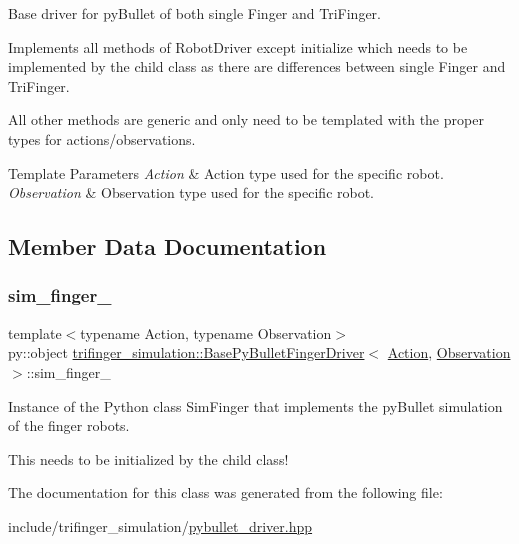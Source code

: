 Base driver for py\+Bullet of both single Finger and Tri\+Finger. 

Implements all methods of Robot\+Driver except {\ttfamily initialize} which needs to be implemented by the child class as there are differences between single Finger and Tri\+Finger.

All other methods are generic and only need to be templated with the proper types for actions/observations.


\begin{DoxyTemplParams}{Template Parameters}
{\em Action} & Action type used for the specific robot. \\
\hline
{\em Observation} & Observation type used for the specific robot. \\
\hline
\end{DoxyTemplParams}


\subsection{Member Data Documentation}
\mbox{\label{classtrifinger__simulation_1_1BasePyBulletFingerDriver_a9f997da6855f64ca5c483093cfb66b06}} 
\subsubsection{\texorpdfstring{sim\+\_\+finger\+\_\+}{sim\_finger\_}}
{\footnotesize\ttfamily template$<$typename Action, typename Observation$>$ \\
py\+::object \hyperlink{classtrifinger__simulation_1_1BasePyBulletFingerDriver}{trifinger\+\_\+simulation\+::\+Base\+Py\+Bullet\+Finger\+Driver}$<$ \hyperlink{classtrifinger__simulation_1_1action_1_1Action}{Action}, \hyperlink{classtrifinger__simulation_1_1observation_1_1Observation}{Observation} $>$\+::sim\+\_\+finger\+\_\+\hspace{0.3cm}{\ttfamily [protected]}}



Instance of the Python class Sim\+Finger that implements the py\+Bullet simulation of the finger robots. 

This needs to be initialized by the child class! 

The documentation for this class was generated from the following file\+:\begin{DoxyCompactItemize}
\item 
include/trifinger\+\_\+simulation/\hyperlink{pybullet__driver_8hpp}{pybullet\+\_\+driver.\+hpp}\end{DoxyCompactItemize}
